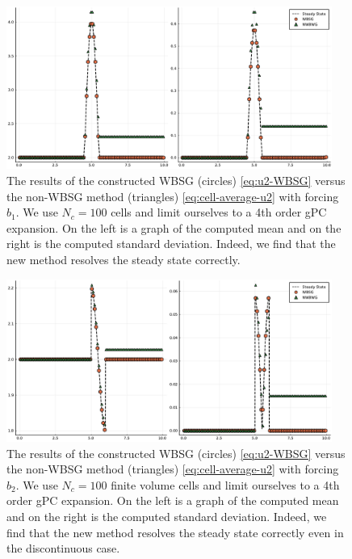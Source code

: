 \documentclass[12pt]{article}
\begin{document}
\begin{figure}[!htb]
    \centering
    \includegraphics[width=0.95\textwidth]{Figures/b1}
    \caption{The results of the constructed WBSG (circles) \eqref{eq:u2-WBSG} versus the non-WBSG method (triangles) \eqref{eq:cell-average-u2} with forcing $b_1$. We use $N_c = 100$ cells and limit ourselves to a 4th order gPC expansion. On the left is a graph of the computed mean and on the right is the computed standard deviation. Indeed, we find that the new method resolves the steady state correctly.}
    \label{fig:b1}
\end{figure}
\begin{figure}[!htb]
    \centering
    \includegraphics[width=0.95\textwidth]{Figures/b2}
    \caption{The results of the constructed WBSG (circles) \eqref{eq:u2-WBSG} versus the non-WBSG method (triangles) \eqref{eq:cell-average-u2} with forcing $b_2$. We use $N_c = 100$ finite volume cells and limit ourselves to a 4th order gPC expansion. On the left is a graph of the computed mean and on the right is the computed standard deviation. Indeed, we find that the new method resolves the steady state correctly even in the discontinuous case.}
    \label{fig:b2}
\end{figure}
\end{document}
